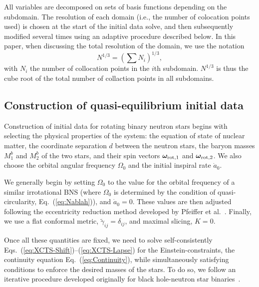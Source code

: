 {  All variables are decomposed on sets of basis functions depending on the subdomain. 
  The resolution of each domain (i.e., the number of colocation points used) 
is chosen at the start of the initial data solve, and then
subsequently modified several times using an adaptive procedure
described below. In this paper, when discussing the total resolution of the
domain, we use the notation 
\begin{equation}
N^{1/3} = \left(\sum
N_i\right)^{1/3},
\end{equation}
with $N_i$ the number of collocation points in the $i$th subdomain. $N^{1/3}$ is thus the cube root of the total number of
collaction points in all subdomains.  

\subsection{Construction of quasi-equilibrium initial data}
\label{sec:IDalgorithm}

Construction of initial data for rotating binary neutron stars
begins with selecting the physical properties of the system: the equation of
state of nuclear matter, the coordinate separation $d$ between the
neutron stars, the baryon masses $M^b_1$ and $M^b_2$ of the two stars, and their
spin vectors ${\bm \omega}_{\rm rot,1}$ and ${\bm \omega}_{\rm
  rot,2}$. We also choose the orbital angular frequency $\Omega_0$
and the initial inspiral rate $\dot{a}_0$.  

We generally begin by setting $\Omega_0$ to the value for the orbital frequency of a similar irrotational BNS (where $\Omega_0$ is determined by the condition of quasi-circularity, Eq.~(\ref{eq:Nablah})), and $\dot a_0=0$.  These values are then adjusted following the eccentricity reduction method
developed by Pfeiffer et al.~\cite{Pfeiffer-Brown-etal:2007}. Finally, we use a flat conformal metric, $\tilde\gamma_{ij}=\delta_{ij}$,
and maximal slicing, $K=0$.

Once all these quantities are fixed, we need to solve self-consistently Eqs.~(\ref{eq:XCTS-Shift})--(\ref{eq:XCTS-Lapse}) for the Einstein-constraints, the continuity equation Eq.~(\ref{eq:Continuity}), while simultaneously satisfying conditions to enforce the desired masses of the stars. 
To do so, we follow an iterative procedure developed originally for black hole-neutron star
binaries~\cite{FoucartEtAl:2011}.

}
